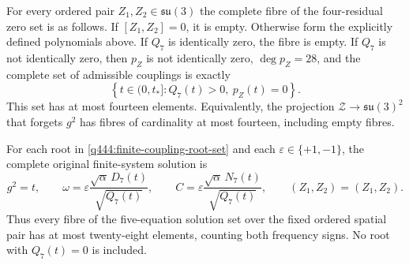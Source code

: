 \begin{theorem}
\label{q444:finite-coupling-fibre}
For every ordered pair $Z_1,Z_2\in\mathfrak{su}(3)$ the complete fibre of
the four-residual zero set is as follows.
If $[Z_1,Z_2]=0$, it is empty. Otherwise form the explicitly defined
polynomials above. If $Q_7$ is identically zero, the fibre is empty.
If $Q_7$ is not identically zero, then $p_Z$ is not identically zero,
$\deg p_Z=28$, and the complete set of admissible couplings is exactly
\begin{equation}
 \left\{t\in(0,t_*]:Q_7(t)>0,\ p_Z(t)=0\right\}.
 \label{q444:finite-coupling-root-set}
\end{equation}
This set has at most fourteen elements. Equivalently, the projection
$\mathcal Z\longrightarrow\mathfrak{su}(3)^2$ that forgets $g^2$ has
fibres of cardinality at most fourteen, including empty fibres.

For each root in \eqref{q444:finite-coupling-root-set} and each
$\varepsilon\in\{+1,-1\}$, the complete original finite-system solution is
\begin{equation}
 g^2=t,\qquad
 \omega=\varepsilon\frac{\sqrt\alpha\,D_7(t)}{\sqrt{Q_7(t)}},\qquad
 C=\varepsilon\frac{\sqrt\alpha\,N_7(t)}{\sqrt{Q_7(t)}},\qquad
 (Z_1,Z_2)=(Z_1,Z_2).
 \label{q444:finite-coupling-reconstruction}
\end{equation}
Thus every fibre of the five-equation solution set over the fixed ordered
spatial pair has at most twenty-eight elements, counting both frequency
signs. No root with $Q_7(t)=0$ is included.
\end{theorem}
